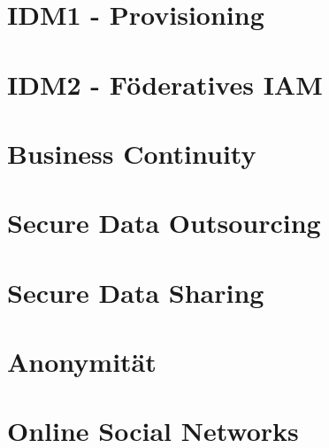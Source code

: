 \section{IDM1 - Provisioning}

\section{IDM2 - Föderatives IAM}

\section{Business Continuity}

\section{Secure Data Outsourcing}

\section{Secure Data Sharing}

\section{Anonymität}

\section{Online Social Networks}
